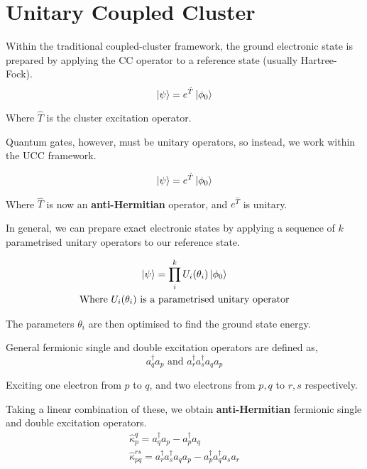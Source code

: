 \section{Unitary Coupled Cluster}

Within the traditional coupled-cluster framework, the ground electronic state is prepared by applying the CC operator to a reference state (usually Hartree-Fock).
\begin{equation*}
    \ket\psi = e^{\hat T} \ket{\phi_0}
\end{equation*}

Where $\hat T$ is the cluster excitation operator.

Quantum gates, however, must be unitary operators, so instead, we work within the UCC framework.

\begin{equation*}
    \ket\psi = e^{\hat T} \ket{\phi_0}
\end{equation*}

Where $\hat T$ is now an \textbf{anti-Hermitian} operator, and $e^{\hat T}$ is unitary.

In general, we can prepare exact electronic states by applying a sequence of $k$ parametrised unitary operators to our reference state.

\begin{equation*}
\begin{gathered}
    \ket\psi = \prod_i^k U_i(\theta_i) \ket{\phi_0} \\
    \text{Where $U_i(\theta_i)$ is a parametrised unitary operator}
\end{gathered}
\end{equation*}\smallskip

The parameters $\theta_i$ are then optimised to find the ground state energy.

General fermionic single and double excitation operators are defined as,
\begin{equation*}
    a_q^\dagger a_p \text{ and } a_r^\dagger a_s^\dagger a_q a_p
\end{equation*}

Exciting one electron from $p$ to $q$, and two electrons from $p, q$ to $r, s$ respectively.

Taking a linear combination of these, we obtain \textbf{anti-Hermitian} fermionic single and double excitation operators.
\begin{equation*}
\begin{gathered}
    \hat\kappa_p^q = a_q^\dagger a_p - a_p^\dagger a_q \\
    \hat\kappa_{pq}^{rs} =
    a_r^\dagger a_s^\dagger a_q a_p - a_p^\dagger a_q^\dagger a_s a_r
\end{gathered}
\end{equation*}\smallskip

